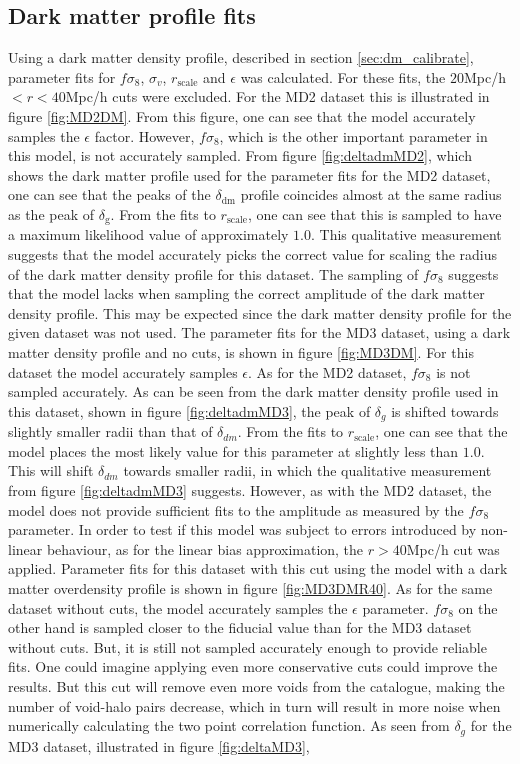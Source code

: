 \subsection{Dark matter profile fits}
Using a dark matter density profile, described in section \ref{sec:dm_calibrate}, parameter fits for $f\sigma_8$, $\sigma_v$, $r_\mathrm{scale}$ and $\epsilon$ was calculated. For these fits, the $20$Mpc/h$<r<40$Mpc/h cuts were excluded. For the MD2 dataset this is illustrated in figure \ref{fig:MD2DM}. From this figure, one can see that the model accurately samples the $\epsilon$ factor. However, $f\sigma_8$, which is the other important parameter in this model, is not accurately sampled. From figure \ref{fig:deltadmMD2}, which shows the dark matter profile used for the parameter fits for the MD2 dataset, one can see that the peaks of the $\delta_{\mathrm{dm}}$ profile coincides almost at the same radius as the peak of $\delta_\mathrm{g}$. From the fits to $r_\mathrm{scale}$, one can see that this is sampled to have a maximum likelihood value of approximately $1.0$. This qualitative measurement suggests that the model accurately picks the correct value for scaling the radius of the dark matter density profile for this dataset. The sampling of $f\sigma_8$ suggests that the model lacks when sampling the correct amplitude of the dark matter density profile. This may be expected since the dark matter density profile for the given dataset was not used. The parameter fits for the MD3 dataset, using a dark matter density profile and no cuts, is shown in figure \ref{fig:MD3DM}. For this dataset the model accurately samples $\epsilon$. As for the MD2 dataset, $f\sigma_8$ is not sampled accurately. As can be seen from the dark matter density profile used in this dataset, shown in figure \ref{fig:deltadmMD3}, the peak of $\delta_g$ is shifted towards slightly smaller radii than that of $\delta_{dm}$. From the fits to $r_{\mathrm{scale}}$, one can see that the model places the most likely value for this parameter at slightly less than $1.0$. This will shift $\delta_{dm}$ towards smaller radii, in which the qualitative measurement from figure \ref{fig:deltadmMD3} suggests. However, as with the MD2 dataset, the model does not provide sufficient fits to the amplitude as measured by the $f\sigma_8$ parameter. In order to test if this model was subject to errors introduced by non-linear behaviour, as for the linear bias approximation, the $r>40$Mpc/h cut was applied. Parameter fits for this dataset with this cut using the model with a dark matter overdensity profile is shown in figure \ref{fig:MD3DMR40}. As for the same dataset without cuts, the model accurately samples the $\epsilon$ parameter. $f\sigma_8$ on the other hand is sampled closer to the fiducial value than for the MD3 dataset without cuts. But, it is still not sampled accurately enough to provide reliable fits. One could imagine applying even more conservative cuts could improve the results. But this cut will remove even more voids from the catalogue, making the number of void-halo pairs decrease, which in turn will result in more noise when numerically calculating the two point correlation function. As seen from $\delta_g$ for the MD3 dataset, illustrated in figure \ref{fig:deltaMD3}, 